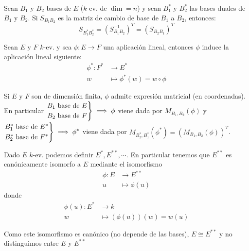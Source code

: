 \begin{prop}
	Sean $B_1$ y $B_2$ bases de $E$ ($k$-ev. de $\dim = n$) y
	sean $B_1^*$ y $B_2^*$ las bases duales de $B_1$ y $B_2$.
	Si $S_{B_1B_2}$ es la matriz de cambio de base de $B_1$ a
	$B_2$, entonces:
	\[
	S_{B_1^*B_2^*} = (S_{B_1B_2}^{-1})^T = (S_{B_2B_1})^T
	\]
\end{prop}

\begin{prop}
	Sean $E$ y $F$ $k$-ev. y sea $\phi \colon E \to F$ una
	aplicación lineal, entonces $\phi$ induce la aplicación
	lineal siguiente:
	\[
	\begin{aligned}
	\phi^* \colon F^* &\to E^*\\
	w &\mapsto \phi^*(w) = w \circ \phi
	\end{aligned}
	\]
\end{prop}
\begin{obs}
	Si $E$ y $F$ son de dimensión finita, $\phi$ admite expresión
	matricial (en coordenadas). En particular
	$\displaystyle \begin{rcases} B_1 \text{ base de } E \\ B_2
	\text{ base de } F \end{rcases} \implies \phi$ viene dada por
	$M_{B_1,B_2}(\phi)$ y $\displaystyle \begin{rcases} B_1^*
	\text{ base de } E^* \\ B_2^* \text{ base de } F^*
	\end{rcases} \implies \phi^*$ viene dada por 
	$M_{B_2^*,B_1^*}(\phi^*) = (M_{B_1,B_2}(\phi))^T$.
\end{obs}
\begin{prop}
	Dado $E$ $k$-ev. podemos definir $E^*,E^{**},\cdots$. En
	particular tenemos que $E^{**}$ es canónicamente isomorfo a
	$E$ mediante el isomorfismo
	\[
	\begin{aligned}
	\phi \colon E &\to E^{**}\\
	u &\mapsto \phi(u)
	\end{aligned}
	\]
	donde
	\[
	\begin{aligned}
	\phi(u) \colon E^* &\to k \\
	w &\mapsto (\phi(u))(w) = w(u)
	\end{aligned}
	\]
\end{prop}
\begin{obs}
	Como este isomorfismo es canónico (no depende de las bases),
	$E \cong E^{**}$ y no distinguimos entre $E$ y $E^{**}$
\end{obs}


